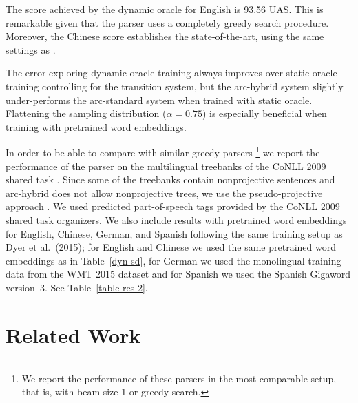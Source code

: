 \documentclass[11pt]{article}
\newcommand{\ignore}[1]{}
\begin{document}
The score achieved by the dynamic oracle for English is 93.56 UAS. This is remarkable given that
the parser uses a completely greedy search procedure. Moreover, the
Chinese score establishes the state-of-the-art, using the same settings as .  

The error-exploring dynamic-oracle training always improves over static oracle training controlling for the transition system, but the arc-hybrid system slightly under-performs
the arc-standard system when trained with static oracle. Flattening the
sampling distribution ($\alpha=0.75$) is
especially beneficial when training with pretrained word embeddings.




In order to be able to compare with similar greedy parsers
\cite{yazdani-henderson:2015:CoNLL,andor-16}\footnote{We report the
  performance of these parsers in the most comparable setup, that is,
  with beam size 1 or greedy search.} we report the performance of
the parser on the multilingual treebanks of the CoNLL 2009 shared task
\cite{conll2009}. Since some of the treebanks contain nonprojective
sentences and arc-hybrid does not allow nonprojective trees, we use
the pseudo-projective approach \cite{nivre05acl}. We used predicted
part-of-speech tags provided by the CoNLL 2009 shared task
organizers. We also include results with pretrained word embeddings
for English, Chinese, German, and Spanish following the same training
setup as Dyer et al.~(2015); for English and Chinese we used the same
pretrained word embeddings as in Table~\ref{dyn-sd}, for German we
used the monolingual training data from the WMT 2015
dataset\ignore{\footnote{\url{http://www.statmt.org/wmt15/translation-task.html}}}
and for Spanish we used the Spanish Gigaword version~3. See Table~\ref{table-res-2}.

\section{Related Work}
\label{sec:related}
\end{document}
